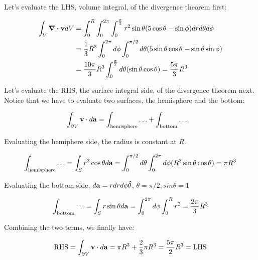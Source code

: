 \documentclass{article}
\numberwithin{equation}{section}
\newcommand{\vbh}[1]{\vb{\hat{#1}}}
\begin{document}
Let's evaluate the LHS, volume integral, of the divergence theorem first:

\begin{equation}
\begin{split}
    \int_V \div \vb{v} dV &= \int_0^R \int_0^{2\pi} \int_0^{\frac{\pi}{2}}  r^2 \sin \theta (5\cos \theta - \sin \phi) dr d \theta d \phi \\
    &= \frac{1}{3} R^3 \int_0^{2\pi} d\phi \int_0^{\pi/2} d \theta ( 5\sin \theta \cos \theta - \sin \theta \sin \phi ) \\
    &= \frac{10\pi}{3} R^3 \int_0^{\frac{\pi}{2}} d \theta (\sin \theta \cos \theta) = \frac{5\pi}{3} R^3 
    \end{split}
\end{equation}

Let's evaluate the RHS, the surface integral side, of the divergence theorem next. Notice that we have to evaluate two surfaces, the hemisphere and the bottom:

\begin{equation}
    \begin{split}
        \int_{\partial V} \vb{v} \cdot d\vb{a} &= \int_{\text{hemisphere}} \ldots + \int_{\text{bottom}} \ldots
    \end{split}
\end{equation}

Evaluating the hemiphere side, the radius is constant at $R$.

\begin{equation}
    \int_{\text{hemisphere}} \ldots = \int_{S} r^3 \cos \theta d\vb{a} = \int_{0}^{\pi/2} d\theta \int_{0}^{2\pi} d\phi (R^3 \sin \theta \cos \theta) = \pi R^3
\end{equation}

Evaluating the bottom side, $d \vb{a} = r dr d\phi \vbh{\theta}$, $\theta = \pi/2, sin \theta = 1$

\begin{equation}
    \int_{\text{bottom}} \ldots = \int_S r \sin \theta d \vb{a} = \int_0^{2\pi} d\phi \int_0^{R} r^2 = \frac{2 \pi }{3} R^3  
\end{equation}

Combining the two terms, we finally have:

\begin{equation}
    \text{RHS} = \int_{\partial V} \vb{v} \cdot d \vb{a} = \pi R^3 + \frac{2}{3} \pi R^3 = \frac{5\pi}{2} R^3 = \text{LHS}
\end{equation}
\end{document}
